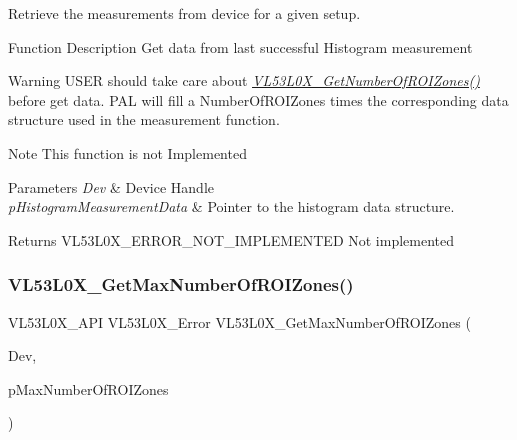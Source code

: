 Retrieve the measurements from device for a given setup. 

\begin{DoxyParagraph}{Function Description}
Get data from last successful Histogram measurement 
\end{DoxyParagraph}
\begin{DoxyWarning}{Warning}
U\+S\+ER should take care about {\itshape \hyperlink{group__VL53L0X__measurement__group_gad345958f05c6b130f35c569dd0d0e4f8}{V\+L53\+L0\+X\+\_\+\+Get\+Number\+Of\+R\+O\+I\+Zones()}} before get data. P\+AL will fill a Number\+Of\+R\+O\+I\+Zones times the corresponding data structure used in the measurement function.
\end{DoxyWarning}
\begin{DoxyNote}{Note}
This function is not Implemented
\end{DoxyNote}

\begin{DoxyParams}{Parameters}
{\em Dev} & Device Handle \\
\hline
{\em p\+Histogram\+Measurement\+Data} & Pointer to the histogram data structure. \\
\hline
\end{DoxyParams}
\begin{DoxyReturn}{Returns}
V\+L53\+L0\+X\+\_\+\+E\+R\+R\+O\+R\+\_\+\+N\+O\+T\+\_\+\+I\+M\+P\+L\+E\+M\+E\+N\+T\+ED Not implemented 
\end{DoxyReturn}
\mbox{\label{group__VL53L0X__measurement__group_gad3d40b6a62638f54f2a87289030e27e7}} 
\subsubsection{\texorpdfstring{V\+L53\+L0\+X\+\_\+\+Get\+Max\+Number\+Of\+R\+O\+I\+Zones()}{VL53L0X\_GetMaxNumberOfROIZones()}}
{\footnotesize\ttfamily V\+L53\+L0\+X\+\_\+\+A\+PI V\+L53\+L0\+X\+\_\+\+Error V\+L53\+L0\+X\+\_\+\+Get\+Max\+Number\+Of\+R\+O\+I\+Zones (\begin{DoxyParamCaption}\item[{\hyperlink{group__VL53L0X__platform__group_ga2d6405308b1dd524b462f1b8fb97d167}{V\+L53\+L0\+X\+\_\+\+D\+EV}}]{Dev,  }\item[{\hyperlink{vl53l0x__types_8h_aba7bc1797add20fe3efdf37ced1182c5}{uint8\+\_\+t} $\ast$}]{p\+Max\+Number\+Of\+R\+O\+I\+Zones }\end{DoxyParamCaption})}



